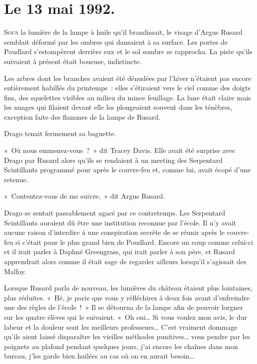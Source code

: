 
\section{Le 13 mai 1992.}

\lettrine{S}{ous} la lumière de la lampe à huile qu'il brandissait, le visage d'Argus Rusard semblait déformé par les ombres qui dansaient à sa surface. Les portes de Poudlard s'estompèrent derrière eux et le sol sombre se rapprocha. La piste qu'ils suivaient à présent était boueuse, indistincte.

Les arbres dont les branches avaient été dénudées par l'hiver n'étaient pas encore entièrement habillés du printemps~: elles s'étiraient vers le ciel comme des doigts fins, des squelettes visibles au milieu du mince feuillage. La lune était claire mais les nuages qui filaient devant elle les plongeaient souvent dans les ténèbres, exception faite des flammes de la lampe de Rusard.

Drago tenait fermement sa baguette.

«~Où nous emmenez-vous~?~» dit Tracey Davis. Elle avait été surprise avec Drago par Rusard alors qu'ils se rendaient à un meeting des Serpentard Scintillants programmé pour après le couvre-feu et, comme lui, avait écopé d'une retenue.

«~Contentez-vous de me suivre,~» dit Argus Rusard.

Drago se sentait passablement agacé par ce contretemps. Les Serpentard Scintillants auraient dû être une institution reconnue par l'école. Il n'y avait aucune raison d'interdire à une conspiration secrète de se réunir après le couvre-feu si c'était pour le plus grand bien de Poudlard. Encore un coup comme celui-ci et il irait parler à Daphné Greengrass, qui irait parler à son père, et Rusard apprendrait alors comme il était sage de regarder ailleurs lorsqu'il s'agissait des Malfoy.

Lorsque Rusard parla de nouveau, les lumières du château étaient plus lointaines, plus réduites. «~Hé, je parie que vous y réfléchirez à deux fois avant d'enfreindre une des règles de l'école~!~» Il se détourna de la lampe afin de pouvoir lorgner sur les quatre élèves qui le suivaient. «~Oh oui… Si vous voulez mon avis, le dur labeur et la douleur sont les meilleurs professeurs… C'est vraiment dommage qu'ils aient laissé disparaître les vieilles méthodes punitives… vous pendre par les poignets au plafond pendant quelques jours, j'ai encore les chaînes dans mon bureau, j'les garde bien huilées au cas où on en aurait besoin…

